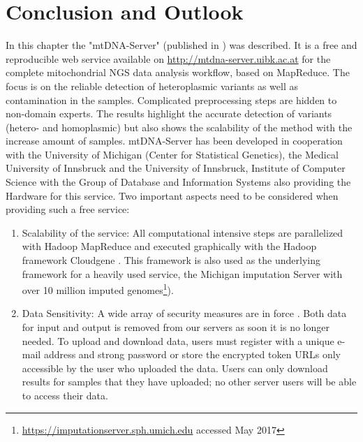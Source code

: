 \section{Conclusion and Outlook}
In this chapter the "mtDNA-Server" (published in \cite{Weissensteiner2016b}) was described. It is a free and reproducible web service available on \url{http://mtdna-server.uibk.ac.at} for the complete mitochondrial NGS data analysis workflow, based on MapReduce. The focus is on the reliable detection of heteroplasmic variants as well as contamination in the samples. Complicated preprocessing steps are hidden to non-domain experts. The results highlight the accurate detection of variants (hetero- and homoplasmic) but also shows the scalability of the method with the increase amount of samples. mtDNA-Server has been developed in cooperation with the University of Michigan (Center for Statistical Genetics), the Medical University of Innsbruck and the University of Innsbruck, Institute of Computer Science with the Group of Database and Information Systems also providing the Hardware for this service.
Two important aspects need to be considered when providing such a free service:
\begin{enumerate}
\item Scalability of the service: All computational intensive steps are parallelized with Hadoop MapReduce and executed graphically with the Hadoop framework Cloudgene \cite{Schonherr2012, Weissensteiner2016b}. This framework is also used as the underlying framework for a heavily used service, the Michigan imputation Server \cite{Das2016} with over 10 million imputed genomes\footnote{\url{https://imputationserver.sph.umich.edu} accessed May 2017}).
\item Data Sensitivity: A wide array of security measures are in force \cite{Weissensteiner2016a}. Both data for input and output is removed from our servers as soon it is no longer needed. To upload and download data, users must register with a unique e-mail address and strong password or store the encrypted token URLs only accessible by the user who uploaded the data. Users can only download results for samples that they have uploaded; no other server users will be able to access their data.
\end{enumerate}

